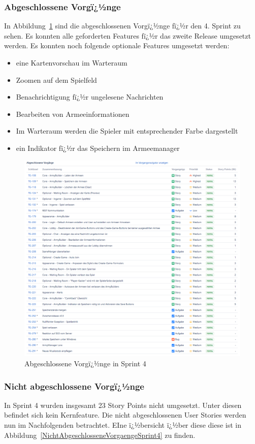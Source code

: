\documentclass[12pt, titlepage]{scrartcl}
\newcommand{\Abb}[1]{%
	Abbildung\ \ref{#1}%
}
\begin{document}
			\subsubsection{Abgeschlossene Vorgï¿½nge}	
			In \Abb{AbgeschlosseneVorgaengeSprint4} sind die abgeschlossenen Vorgï¿½nge fï¿½r den 4. Sprint zu sehen. Es konnten alle geforderten Features fï¿½r das zweite Release umgesetzt werden. Es konnten noch folgende optionale Features umgesetzt werden:
			\begin{itemize}
				\item eine Kartenvorschau im Warteraum
				\item Zoomen auf dem Spielfeld
				\item Benachrichtigung fï¿½r ungelesene Nachrichten
				\item Bearbeiten von Armeeinformationen
				\item Im Warteraum werden die Spieler mit entsprechender Farbe dargestellt
				\item ein Indikator fï¿½r das Speichern im Armeemanager
			\end{itemize}
			\begin{figure}[H] 
				\centering
				\includegraphics[width=1\textwidth]{Abschlossene_Vorgaenge_Sprint_4.png}
				\caption{Abgeschlossene Vorgï¿½nge in Sprint 4}
				\label{AbgeschlosseneVorgaengeSprint4}
			\end{figure}
			
			\subsubsection{Nicht abgeschlossene Vorgï¿½nge}
			In Sprint 4 wurden insgesamt 23 Story Points nicht umgesetzt. Unter diesen befindet sich kein Kernfeature. Die nicht abgeschlossenen User Stories werden nun im Nachfolgenden betrachtet. EIne ï¿½bersicht ï¿½ber diese diese ist in \Abb{NichtAbgeschlosseneVorgaengeSprint4} zu finden.
			
\end{document}
